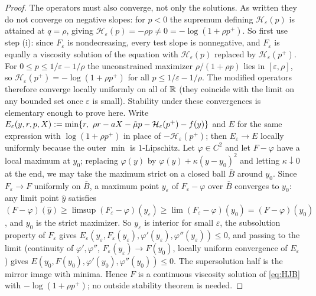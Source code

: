 \begin{proof}
The operators must also converge, not only the solutions. As written they do not converge on negative slopes: for $p<0$ the supremum defining $\mathcal H_\varepsilon(p)$ is attained at $q=\rho$, giving $\mathcal H_\varepsilon(p)=-\rho p\ne0=-\log(1+\rho p^+)$. So first use step (i): since $F_\varepsilon$ is nondecreasing, every test slope is nonnegative, and $F_\varepsilon$ is equally a viscosity solution of the equation with $\mathcal H_\varepsilon(p)$ replaced by $\mathcal H_\varepsilon(p^+)$. For $0\le p\le 1/\varepsilon-1/\rho$ the unconstrained maximizer $\rho/(1+\rho p)$ lies in $[\varepsilon,\rho]$, so $\mathcal H_\varepsilon(p^+)=-\log(1+\rho p^+)$ for all $p\le 1/\varepsilon-1/\rho$. The modified operators therefore converge locally uniformly on all of $\mathbb{R}$ (they coincide with the limit on any bounded set once $\varepsilon$ is small). Stability under these convergences is elementary enough to prove here. Write $E_\varepsilon(y,r,p,X):=\min\{r,\ \rho r-aX-\tilde\mu p-\mathcal H_\varepsilon(p^+)-f(y)\}$ and $E$ for the same expression with $\log(1+\rho p^+)$ in place of $-\mathcal H_\varepsilon(p^+)$; then $E_\varepsilon\to E$ locally uniformly because the outer $\min$ is $1$-Lipschitz. Let $\varphi\in C^2$ and let $F-\varphi$ have a local maximum at $y_0$; replacing $\varphi(y)$ by $\varphi(y)+\kappa(y-y_0)^2$ and letting $\kappa\downarrow0$ at the end, we may take the maximum strict on a closed ball $\bar B$ around $y_0$. Since $F_\varepsilon\to F$ uniformly on $\bar B$, a maximum point $y_\varepsilon$ of $F_\varepsilon-\varphi$ over $\bar B$ converges to $y_0$: any limit point $\hat y$ satisfies $(F-\varphi)(\hat y)\ge\limsup(F_\varepsilon-\varphi)(y_\varepsilon)\ge\lim(F_\varepsilon-\varphi)(y_0)=(F-\varphi)(y_0)$, and $y_0$ is the strict maximizer. So $y_\varepsilon$ is interior for small $\varepsilon$, the subsolution property of $F_\varepsilon$ gives $E_\varepsilon(y_\varepsilon,F_\varepsilon(y_\varepsilon),\varphi'(y_\varepsilon),\varphi''(y_\varepsilon))\le0$, and passing to the limit (continuity of $\varphi',\varphi''$, $F_\varepsilon(y_\varepsilon)\to F(y_0)$, locally uniform convergence of $E_\varepsilon$) gives $E(y_0,F(y_0),\varphi'(y_0),\varphi''(y_0))\le0$. The supersolution half is the mirror image with minima. Hence $F$ is a continuous viscosity solution of \eqref{eq:HJB} with $-\log(1+\rho p^+)$; no outside stability theorem is needed.


\end{proof}
